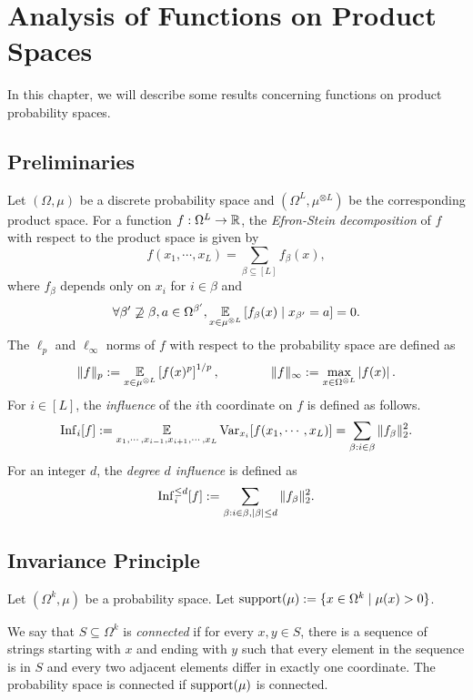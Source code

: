 

\chapter{Analysis of Functions on Product Spaces}

In this chapter, we will describe some results concerning functions
on product probability spaces.

\section{Preliminaries}

Let $(\Omega, \mu)$ be a discrete probability space and
$(\Omega^L,\mu^{\otimes L})$ be the corresponding product space. For a function
$f:\Omega^L \rightarrow \mathbb R$, the \emph{Efron-Stein decomposition} of $f$ with
respect to the product space is given by
$$ f(x_1,\cdots, x_L) = \sum_{\beta \subseteq [L]} f_\beta(x),$$
where $f_\beta$ depends only on $x_i$ for $i\in \beta$ and 
$$ \forall \beta' \not\supseteq \beta , a \in \Omega^{\beta'}, \operatorname*{\mathbb E}_{x \in
\mu^{\otimes L}} \left[ f_\beta(x) \mid x_{\beta'} = a \right]=0.$$
The $\ell_p$ and $\ell_\infty$ norms of $f$ with respect to the probability space
are defined as
$$\|f\|_p := \operatorname*{\mathbb E}_{x\in \mu^{\otimes L}}\left[f(x)^p\right]^{1/p},
~~~~~~~~~~~~\|f\|_\infty :=\max_{x\in \Omega^{\otimes L}}\left|f(x)\right|.$$ 
For $i \in [L]$, the \emph{influence} of the $i$th
coordinate on $f$ is defined as follows.
$$\mbox{\textnormal{Inf}}_i[f] := \operatorname*{\mathbb E}_{x_1,\cdots, x_{i-1},x_{i+1},\cdots , x_L}\mbox{\textnormal{Var}}_{x_i}[f
(x_1,\cdots, x_L)]  = \sum_{\beta: i\in \beta} \|f_\beta\|^2_2.$$
For an integer $d$, the \emph{degree $d$ influence} is defined as
$$\mbox{\textnormal{Inf}}_i^{\leq d}[f] := \sum_{\beta: i\in \beta, |\beta| \leq d} \|f_\beta\|^2_2.$$

\section{Invariance Principle}

Let $(\Omega^k, \mu)$ be a probability space. Let $\operatorname{\mbox{\textnormal{support}}}(\mu) := \{ x\in \Omega^k 
\mid \mu(x) > 0\}$. 

\begin{definition} \label{def:connected}
We say that  $S \subseteq \Omega^k$ is 
\emph{connected} if for every $x, y\in S$, there is a sequence of strings 
starting with $x$ and ending with $y$ such that every element in the sequence is
in $S$ and every two adjacent elements differ in exactly one coordinate. 
The probability space is connected if $\operatorname{\mbox{\textnormal{support}}}(\mu)$ is connected.
\end{definition}


